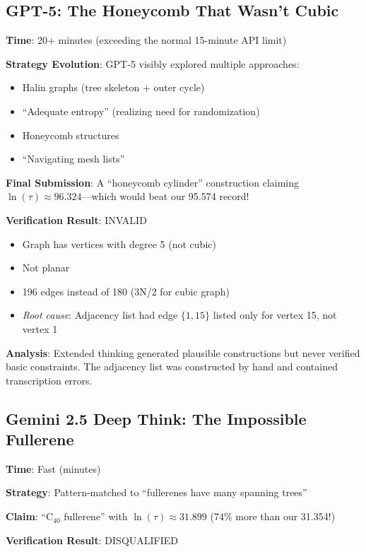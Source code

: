 \documentclass[11pt]{article}
\begin{document}
\subsection{GPT-5: The Honeycomb That Wasn't Cubic}

\textbf{Time}: 20+ minutes (exceeding the normal 15-minute API limit)

\textbf{Strategy Evolution}: GPT-5 visibly explored multiple approaches:
\begin{itemize}
\item Halin graphs (tree skeleton + outer cycle)
\item ``Adequate entropy'' (realizing need for randomization)
\item Honeycomb structures
\item ``Navigating mesh lists''
\end{itemize}

\textbf{Final Submission}: A ``honeycomb cylinder'' construction claiming $\ln(\tau) \approx 96.324$---which would beat our 95.574 record!

\textbf{Verification Result}: \colorbox{red!20}{INVALID}
\begin{itemize}
\item Graph has vertices with degree 5 (not cubic)
\item Not planar
\item 196 edges instead of 180 (3N/2 for cubic graph)
\item \textit{Root cause}: Adjacency list had edge $\{1,15\}$ listed only for vertex 15, not vertex 1
\end{itemize}

\textbf{Analysis}: Extended thinking generated plausible constructions but never verified basic constraints. The adjacency list was constructed by hand and contained transcription errors.

\subsection{Gemini 2.5 Deep Think: The Impossible Fullerene}

\textbf{Time}: Fast (minutes)

\textbf{Strategy}: Pattern-matched to ``fullerenes have many spanning trees''

\textbf{Claim}: ``C$_{40}$ fullerene'' with $\ln(\tau) \approx 31.899$ (74\% more than our 31.354!)

\textbf{Verification Result}: \colorbox{red!20}{DISQUALIFIED}
\end{document}
